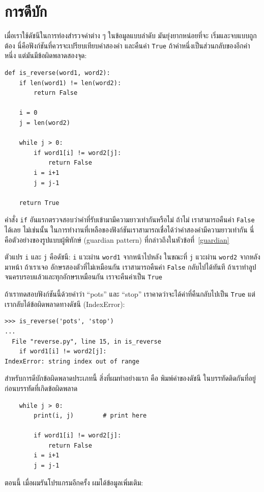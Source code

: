 \section{การดีบัก}

เมื่อเราใช้ดัชนีในการท่องสำรวจค่าต่าง ๆ ในข้อมูลแบบลำดับ มันยุ่งยากหน่อยที่จะ
เริ่มและจบแบบถูกต้อง นี่คือฟังก์ชันที่ควรจะเปรียบเทียบคำสองคำ และคืนค่า {\tt True}
ถ้าคำหนึ่งเป็นส่วนกลับของอีกคำหนึ่ง แต่มันมีข้อผิดพลาดสองจุด:

\begin{verbatim}
def is_reverse(word1, word2):
    if len(word1) != len(word2):
        return False
    
    i = 0
    j = len(word2)

    while j > 0:
        if word1[i] != word2[j]:
            return False
        i = i+1
        j = j-1

    return True
\end{verbatim}
%
คำสั่ง {\tt if} อันแรกตรวจสอบว่าคำที่รับเข้ามามีความยาวเท่ากันหรือไม่ 
ถ้าไม่ เราสามารถคืนค่า {\tt False} ได้เลย ไม่เช่นนั้น ในการทำงานที่เหลือของฟังก์ชันเราสามารถเชื่อได้ว่าคำสองคำมีความยาวเท่ากัน นี่คือตัวอย่างของรูปแบบผู้พิทักษ์ (guardian pattern)
ที่กล่าวถึงในหัวข้อที่~\ref{guardian} 

ตัวแปร {\tt i} และ {\tt j} คือดัชนี:  {\tt i} แวะผ่าน {\tt word1}
จากหน้าไปหลัง ในขณะที่ {\tt j} แวะผ่าน {\tt word2} จากหลังมาหน้า ถ้าเราเจอ
อักษรสองตัวที่ไม่เหมือนกัน เราสามารถคืนค่า {\tt False} กลับไปได้ทันที 
ถ้าเราทำลูปจนครบรอบแล้วและทุกอักษรเหมือนกัน เราจะคืนค่าเป็น {\tt True}

ถ้าเราทดสอบฟังก์ชันนี้ด้วยคำว่า ``pots'' และ ``stop'' เราคาดว่าจะได้ค่าที่คืนกลับไปเป็น
{\tt True} แต่เรากลับได้ข้อผิดพลาดทางดัชนี (IndexError): 


\begin{verbatim}
>>> is_reverse('pots', 'stop')
...
  File "reverse.py", line 15, in is_reverse
    if word1[i] != word2[j]:
IndexError: string index out of range
\end{verbatim}
%
สำหรับการดีบักข้อผิดพลาดประเภทนี้ สิ่งที่ผมทำอย่างแรก คือ พิมพ์ค่าของดัชนี
ในบรรทัดติดกันที่อยู่ก่อนบรรทัดที่เกิดข้อผิดพลาด

\begin{verbatim}
    while j > 0:
        print(i, j)        # print here
        
        if word1[i] != word2[j]:
            return False
        i = i+1
        j = j-1
\end{verbatim}
%
ตอนนี้ เมื่อผมรันโปรแกรมอีกครั้ง ผมได้ข้อมูลเพิ่มเติม:

